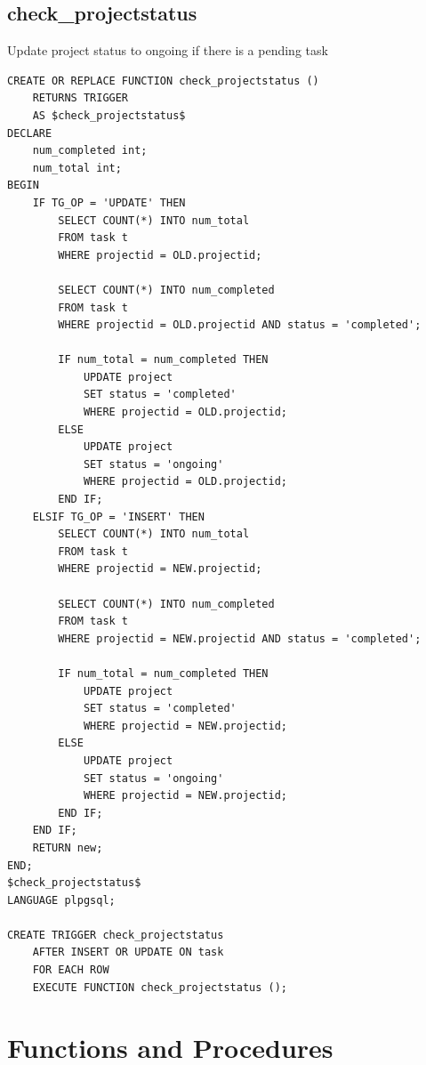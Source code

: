 \documentclass[conference,onecolumn]{IEEEtran}
\begin{document}
\subsection{\textbf{check\_projectstatus}}
Update project status to ongoing if there is a pending task
\begin{verbatim}
CREATE OR REPLACE FUNCTION check_projectstatus ()
    RETURNS TRIGGER
    AS $check_projectstatus$
DECLARE
    num_completed int;
    num_total int;
BEGIN
    IF TG_OP = 'UPDATE' THEN
        SELECT COUNT(*) INTO num_total
        FROM task t
        WHERE projectid = OLD.projectid;

        SELECT COUNT(*) INTO num_completed
        FROM task t
        WHERE projectid = OLD.projectid AND status = 'completed';

        IF num_total = num_completed THEN
            UPDATE project
            SET status = 'completed'
            WHERE projectid = OLD.projectid;
        ELSE
            UPDATE project
            SET status = 'ongoing'
            WHERE projectid = OLD.projectid;
        END IF;
    ELSIF TG_OP = 'INSERT' THEN
        SELECT COUNT(*) INTO num_total
        FROM task t
        WHERE projectid = NEW.projectid;

        SELECT COUNT(*) INTO num_completed
        FROM task t
        WHERE projectid = NEW.projectid AND status = 'completed';

        IF num_total = num_completed THEN
            UPDATE project
            SET status = 'completed'
            WHERE projectid = NEW.projectid;
        ELSE
            UPDATE project
            SET status = 'ongoing'
            WHERE projectid = NEW.projectid;
        END IF;
    END IF;
    RETURN new;
END;
$check_projectstatus$
LANGUAGE plpgsql;

CREATE TRIGGER check_projectstatus
    AFTER INSERT OR UPDATE ON task
    FOR EACH ROW
    EXECUTE FUNCTION check_projectstatus ();
\end{verbatim}

\newpage
\section{Functions and Procedures}
\end{document}
